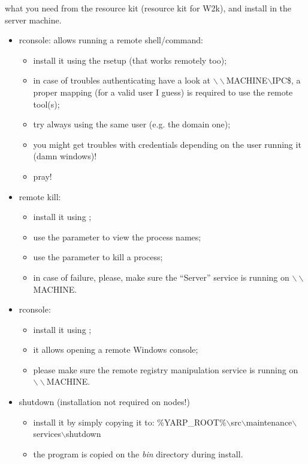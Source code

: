  what you need from the resource kit (resource kit for W2k), and install in the server machine.
\begin{itemize}
\item rconsole: allows running a remote shell/command:

\begin{itemize}
\item install it using the rsetup (that works remotely too);
\item in case of troubles authenticating have a look at $\backslash\backslash$MACHINE$\backslash$IPC\$, a
proper mapping (for a valid user I guess) is required to use the remote tool(s);
\item try always using the same user (e.g. the domain one);
\item you might get troubles with credentials depending on the user running it (damn windows)!
\item pray!
\end{itemize}

\item remote kill:
\begin{itemize}
\item install it using ;
\item use the  parameter to view the process names;
\item use the  parameter to kill a process;
\item in case of failure, please, make sure the ``Server'' service is running on $\backslash\backslash$MACHINE.
\end{itemize}

\item rconsole:
\begin{itemize}
\item install it using ;
\item it allows opening a remote Windows console;
\item please make sure the remote registry manipulation service is running on $\backslash\backslash$MACHINE.
\end{itemize}

\item shutdown (installation not required on nodes!)
\begin{itemize}
\item install it by simply copying it to: \%YARP\_ROOT\%$\backslash$src$\backslash$maintenance$\backslash$services$\backslash$shutdown
\item the program is copied on the {\em bin} directory during install.
\end{itemize}

\end{itemize}

